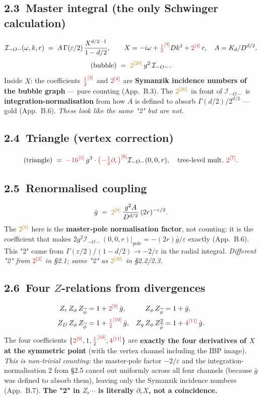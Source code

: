 \documentclass[11pt,a4paper]{article}
\newcommand{\cv}[2]{{\color{cntcol}{#2}^{[#1]}}}   %
\newcommand{\iv}[2]{{\color{intcol}{#2}^{[#1]}}}   %
\begin{document}
\subsection*{2.3\ Master integral (the only Schwinger calculation)}
\[
\mathcal I_{-O-}(\omega,k,r)
\;=\; A\,\Gamma(\varepsilon/2)\,
\frac{X^{d/2-1}}{1-d/2},
\qquad
X = -i\omega + \cv{3}{\tfrac{1}{2}}Dk^{2} + \cv{4}{2}\,r,
\quad A = K_{d}/D^{d/2}.
\]
\[
\text{(bubble)} \;=\; \iv{20}{2}\,g^{2}\,\mathcal I_{-O-}.
\]
\noindent Inside $X$: the coefficients $\cv{3}{\tfrac{1}{2}}$ and $\cv{4}{2}$ are
\textbf{Symanzik incidence numbers of the bubble graph} --- pure counting (App.~B.3).
The $\iv{20}{2}$ in front of $\mathcal{I}_{-O-}$ is \textbf{integration-normalisation}
from how $A$ is defined to absorb $\Gamma(d/2)/2^{d/2}$ --- gold (App.~B.6). \emph{These
look like the same "2" but are not.}

\subsection*{2.4\ Triangle (vertex correction)}
\[
\text{(triangle)}
\;=\; \cv{5}{-16}\,g^{3}\cdot \cv{6}{\bigl(-\tfrac{1}{2}\partial_{r}\bigr)}\mathcal I_{-O-}(0,0,r),
\quad\text{tree-level mult.\ }\cv{7}{2}.
\]

\subsection*{2.5\ Renormalised coupling}
\[
\bar g \;=\; \iv{8}{2}\,\frac{g^{2}A}{D^{d/2}}\,(2r)^{-\varepsilon/2}.
\]
\noindent The $\iv{8}{2}$ here is the \textbf{master-pole normalisation factor}, not
counting: it is the coefficient that makes $2g^{2}\mathcal{I}_{-O-}(0,0,r)|_{\text{pole}}
= -(2r)\bar g/\varepsilon$ exactly (App.~B.6). This "2" came from $\Gamma(\varepsilon/2)/(1-d/2)\to-2/\varepsilon$
in the radial integral. \emph{Different "2" from} $\cv{2}{2}$ \emph{in \S 2.1; same "2" as}
$\iv{20}{2}$ \emph{in \S 2.2/2.3.}

\subsection*{2.6\ Four $Z$-relations from divergences}
\begin{align*}
Z_{r}\,Z_{\phi}\,Z_{\widetilde\phi} &= 1 + \cv{9}{2}\,\bar g, &
Z_{\phi}\,Z_{\widetilde\phi} &= 1 + \bar g, \\
Z_{D}\,Z_{\phi}\,Z_{\widetilde\phi} &= 1 + \cv{10}{\tfrac{1}{2}}\,\bar g, &
Z_{g}\,Z_{\phi}\,Z_{\widetilde\phi}^{2} &= 1 + \cv{11}{4}\,\bar g.
\end{align*}
\noindent The four coefficients $\{\cv{9}{2},1,\cv{10}{\tfrac{1}{2}},\cv{11}{4}\}$ are
\textbf{exactly the four derivatives of $X$ at the symmetric point} (with the vertex
channel including the IBP image). \emph{This is non-trivial counting:} the master-pole
factor $-2/\varepsilon$ and the integration-normalisation $2$ from §2.5 cancel out
uniformly across all four channels (because $\bar g$ was defined to absorb them), leaving
only the Symanzik incidence numbers (App.~B.7). \textbf{The "2" in $Z_{r}\cdots$ is
literally $\partial_{r}X$, not a coincidence.}
\end{document}
